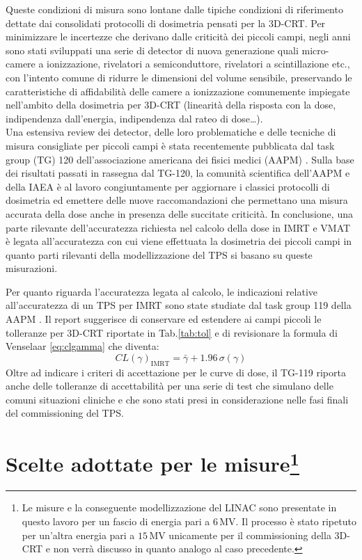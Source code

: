 Queste condizioni di misura sono lontane dalle tipiche condizioni di riferimento dettate dai consolidati protocolli di dosimetria \cite{Almond1999,Andreo2006} pensati per la 3D-CRT. Per minimizzare le incertezze che derivano dalle criticità dei piccoli campi, negli anni sono stati sviluppati una serie di detector di nuova generazione quali micro-camere a ionizzazione, rivelatori a semiconduttore, rivelatori a scintillazione etc., con l'intento comune di ridurre le dimensioni del volume sensibile, preservando le caratteristiche di affidabilità delle camere a ionizzazione comunemente impiegate nell'ambito della dosimetria per 3D-CRT (linearità della risposta con la dose, indipendenza dall'energia, indipendenza dal rateo di dose\ldots).\\
Una estensiva review dei detector, delle loro problematiche e delle tecniche di misura consigliate per piccoli campi è stata recentemente pubblicata dal task group (TG) 120 dell'associazione americana dei fisici medici (AAPM) \cite{Low2011}. Sulla base dei risultati passati in rassegna dal TG-120, la comunità scientifica dell'AAPM e della IAEA è al lavoro congiuntamente per aggiornare i classici protocolli di dosimetria ed emettere delle nuove raccomandazioni che permettano una misura accurata della dose anche in presenza delle succitate criticità. In conclusione, una parte rilevante dell'accuratezza richiesta nel calcolo della dose in IMRT e VMAT è legata all'accuratezza con cui viene effettuata la dosimetria dei piccoli campi in quanto parti rilevanti della modellizzazione del TPS si basano su queste misurazioni.

Per quanto riguarda l'accuratezza legata al calcolo, le indicazioni relative all'accuratezza di un TPS per IMRT sono state studiate dal task group 119 della AAPM \cite{Ezzell2009}. Il report suggerisce di conservare ed estendere ai campi piccoli le tolleranze per 3D-CRT riportate in Tab.\ref{tab:tol} e di revisionare la formula di Venselaar \eqref{eq:clgamma} che diventa:
\begin{equation}
CL(\gamma)_{\text{IMRT}} = \bar{\gamma} + 1.96\,\sigma(\gamma)
\end{equation}
Oltre ad indicare i criteri di accettazione per le curve di dose, il TG-119 riporta anche delle tolleranze di accettabilità per una serie di test che simulano delle comuni situazioni cliniche e che sono stati presi in considerazione nelle fasi finali del commissioning del TPS. 

\section[Scelte adottate per le misure]{Scelte adottate per le misure\protect\footnote{Le misure e la conseguente modellizzazione del LINAC sono presentate in questo lavoro per un fascio di energia pari a $6\,$MV. Il processo è stato ripetuto per un'altra energia pari a $15\,$MV unicamente per il commissioning della 3D-CRT e non verrà discusso in quanto analogo al caso precedente.}}

